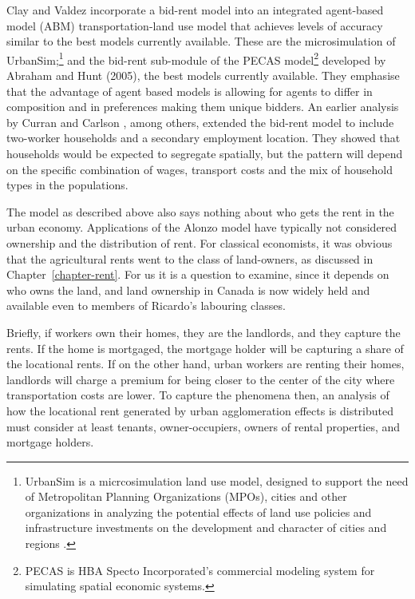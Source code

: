 Clay and Valdez incorporate a bid-rent model into an integrated agent-based model (ABM) transportation-land use model that achieves levels of accuracy similar to the best models currently available. These are the microsimulation of UrbanSim;\footnote{UrbanSim is a micrcosimulation land use model, designed to support the need of Metropolitan Planning Organizations (MPOs), cities and other organizations in analyzing the potential effects of land use policies and infrastructure investments on the development and character of cities and regions \cite{waddellmodellinurbandev2002}.} %
and the bid-rent sub-module of the PECAS model\footnote{PECAS is  HBA Specto Incorporated's commercial modeling system  for simulating spatial economic systems.} developed by Abraham and Hunt (2005), the best models currently available. They emphasise that the advantage of agent based models is allowing for agents to differ in composition and in preferences making them unique bidders. 
An earlier analysis by Curran and Carlson \cite{curranTheoryResidentialLocation1982}, among others, extended the bid-rent model to include two-worker households and a secondary employment location. They showed that households would be expected to segregate spatially, but the pattern will depend on the specific combination of wages, transport costs and the mix of household types in the populations. 

The model as described above also says nothing about who gets the rent in the urban economy. Applications of the \Gls{Alonzo model} have typically not considered ownership and the distribution of rent. For classical economists, it was obvious that the agricultural rents went to the class of land-owners, as discussed in Chapter~\ref{chapter-rent}. 
For us it is a question to examine, since it depends on who owns the land, and land ownership in Canada is now widely held and available even to members of Ricardo's labouring classes.
 
Briefly, if workers own their homes, they are the landlords, and they capture the rents. If the home is mortgaged, the mortgage holder will be capturing a share of the locational rents. If on the other hand, urban workers are renting their homes, landlords will charge a premium for being closer to the center of the city where transportation costs are lower. To capture the phenomena then, an analysis of how the locational rent generated by urban agglomeration effects is distributed must consider at least tenants, owner-occupiers, owners of rental properties, and mortgage holders. 


